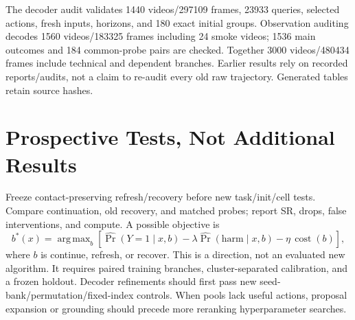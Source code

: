\documentclass{article}
\DeclareMathOperator*{\argmax}{arg\,max}
\begin{document}
The decoder audit validates 1440 videos/297109 frames, 23933 queries,
selected actions, fresh inputs, horizons, and 180 exact initial groups.
Observation auditing decodes 1560 videos/183325 frames including 24 smoke videos;
1536 main outcomes and 184 common-probe pairs are checked.
Together 3000 videos/480434 frames include technical and dependent branches.
Earlier results rely on recorded reports/audits, not a claim to re-audit
every old raw trajectory. Generated tables retain source hashes.

\section{Prospective Tests, Not Additional Results}
Freeze contact-preserving refresh/recovery before new task/init/cell tests.
Compare continuation, old recovery, and matched probes; report SR, drops,
false interventions, and compute. A possible objective is
\begin{equation}
b^*(x)=\argmax_b[
\widehat{\Pr}(Y=1\mid x,b)-\lambda\widehat{\Pr}(\mathrm{harm}\mid x,b)
-\eta\,\operatorname{cost}(b)],
\end{equation}
where $b$ is continue, refresh, or recover. This is a direction, not an evaluated
new algorithm. It requires paired training branches, cluster-separated
calibration, and a frozen holdout.
Decoder refinements should first pass new seed-bank/permutation/fixed-index
controls. When pools lack useful actions, proposal expansion or grounding
should precede more reranking hyperparameter searches.
\end{document}
